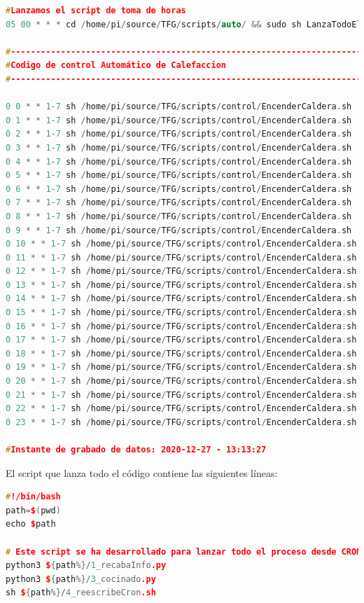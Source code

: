 \begin{lstlisting}[language=cpp, basicstyle=\tiny, caption={Crontab funcionando correctamente.}]
#Lanzamos el script de toma de horas
05 00 * * * cd /home/pi/source/TFG/scripts/auto/ && sudo sh LanzaTodoElProceso.sh

#--------------------------------------------------------------------------
#Codigo de control Automático de Calefaccion 
#--------------------------------------------------------------------------
 
0 0 * * 1-7 sh /home/pi/source/TFG/scripts/control/EncenderCaldera.sh
0 1 * * 1-7 sh /home/pi/source/TFG/scripts/control/EncenderCaldera.sh
0 2 * * 1-7 sh /home/pi/source/TFG/scripts/control/EncenderCaldera.sh
0 3 * * 1-7 sh /home/pi/source/TFG/scripts/control/EncenderCaldera.sh
0 4 * * 1-7 sh /home/pi/source/TFG/scripts/control/EncenderCaldera.sh
0 5 * * 1-7 sh /home/pi/source/TFG/scripts/control/EncenderCaldera.sh
0 6 * * 1-7 sh /home/pi/source/TFG/scripts/control/EncenderCaldera.sh
0 7 * * 1-7 sh /home/pi/source/TFG/scripts/control/EncenderCaldera.sh
0 8 * * 1-7 sh /home/pi/source/TFG/scripts/control/EncenderCaldera.sh
0 9 * * 1-7 sh /home/pi/source/TFG/scripts/control/EncenderCaldera.sh
0 10 * * 1-7 sh /home/pi/source/TFG/scripts/control/EncenderCaldera.sh
0 11 * * 1-7 sh /home/pi/source/TFG/scripts/control/EncenderCaldera.sh
0 12 * * 1-7 sh /home/pi/source/TFG/scripts/control/EncenderCaldera.sh
0 13 * * 1-7 sh /home/pi/source/TFG/scripts/control/EncenderCaldera.sh
0 14 * * 1-7 sh /home/pi/source/TFG/scripts/control/EncenderCaldera.sh
0 15 * * 1-7 sh /home/pi/source/TFG/scripts/control/EncenderCaldera.sh
0 16 * * 1-7 sh /home/pi/source/TFG/scripts/control/EncenderCaldera.sh
0 17 * * 1-7 sh /home/pi/source/TFG/scripts/control/EncenderCaldera.sh
0 18 * * 1-7 sh /home/pi/source/TFG/scripts/control/EncenderCaldera.sh
0 19 * * 1-7 sh /home/pi/source/TFG/scripts/control/EncenderCaldera.sh
0 20 * * 1-7 sh /home/pi/source/TFG/scripts/control/EncenderCaldera.sh
0 21 * * 1-7 sh /home/pi/source/TFG/scripts/control/EncenderCaldera.sh
0 22 * * 1-7 sh /home/pi/source/TFG/scripts/control/EncenderCaldera.sh
0 23 * * 1-7 sh /home/pi/source/TFG/scripts/control/EncenderCaldera.sh

#Instante de grabado de datos: 2020-12-27 - 13:13:27

\end{lstlisting}

El script que lanza todo el código contiene las siguientes líneas:

\begin{lstlisting}[language=cpp, caption={Script que lanza el proceso automático completo.}]
#!/bin/bash
path=$(pwd)
echo $path

# Este script se ha desarrollado para lanzar todo el proceso desde CRON.
python3 ${path%}/1_recabaInfo.py
python3 ${path%}/3_cocinado.py
sh ${path%}/4_reescribeCron.sh
\end{lstlisting}

